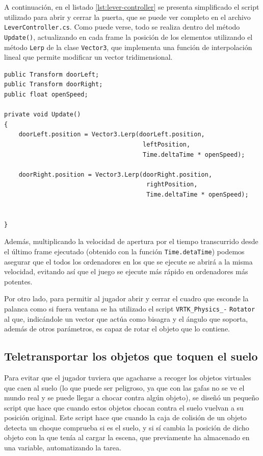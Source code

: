 A continuación, en el listado \ref{lst:lever-controller} se presenta simplificado el script utilizado para abrir y cerrar la puerta, que se puede ver completo en el archivo \texttt{LeverController.cs}. Como puede verse, todo se realiza dentro del método \texttt{Update()}, actualizando en cada frame la posición de los elementos utilizando el método \texttt{Lerp} de la clase \texttt{Vector3}, que implementa una función de interpolación lineal que permite modificar un vector tridimensional.

\begin{lstlisting}[caption=Fragmento del script para abrir y cerrar una puerta abatible con una palanca, label=lst:lever-controller]
public Transform doorLeft;
public Transform doorRight;
public float openSpeed;

private void Update()
{
    doorLeft.position = Vector3.Lerp(doorLeft.position,
                                      leftPosition,
                                      Time.deltaTime * openSpeed);
    
    doorRight.position = Vector3.Lerp(doorRight.position,
                                       rightPosition,
                                       Time.deltaTime * openSpeed);
    

}
\end{lstlisting}

Además, multiplicando la velocidad de apertura por el tiempo transcurrido desde el último frame ejecutado (obtenido con la función \texttt{Time.detaTime}) podemos asegurar que el todos los ordenadores en los que se ejecute se abrirá a la misma velocidad, evitando así que el juego se ejecute más rápido en ordenadores más potentes.

Por otro lado, para permitir al jugador abrir y cerrar el cuadro que esconde la palanca como si fuera ventana se ha utilizado el script \texttt{VRTK\_Physics\_-} \texttt{Rotator} al que, indicándole un vector que actúa como bisagra y el ángulo que soporta, además de otros parámetros, es capaz de rotar el objeto que lo contiene.

\subsection{Teletransportar los objetos que toquen el suelo}

Para evitar que el jugador tuviera que agacharse a recoger los objetos virtuales que caen al suelo (lo que puede ser peligroso, ya que con las gafas no se ve el mundo real y se puede llegar a chocar contra algún objeto), se diseñó un pequeño script que hace que cuando estos objetos chocan contra el suelo vuelvan a su posición original. Este script hace que cuando la caja de colisión de un objeto detecta un choque comprueba si es el suelo, y si sí cambia la posición de dicho objeto con la que tenía al cargar la escena, que previamente ha almacenado en una variable, automatizando la tarea.

